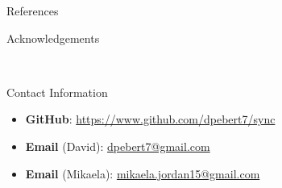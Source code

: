 \documentclass[final, xcolor=dvipsnames]{beamer}
\newlength{\onecolwid}
\begin{document}
\begin{frame}[t]
\begin{columns}[t]
\begin{column}{\onecolwid}
\begin{block}{References}
\end{block}



\begin{block}{Acknowledgements}

\small{} \\

\end{block}



\begin{alertblock}{Contact Information}

\begin{itemize}
\item \textbf{GitHub}: \href{https://www.github.com/dpebert7/sync}{https://www.github.com/dpebert7/sync}
\item \textbf{Email} (David): \href{mailto:dpebert7@gmail.com}{dpebert7@gmail.com}
\item \textbf{Email} (Mikaela): \href{mailto:mikaela.jordan15@gmail.com}{mikaela.jordan15@gmail.com}
\end{itemize}

\end{alertblock}

\begin{center}
\begin{tabular}{ccc}
\end{tabular}
\end{center}


\end{column} %

\end{columns} %

\end{frame} %
\end{document}

